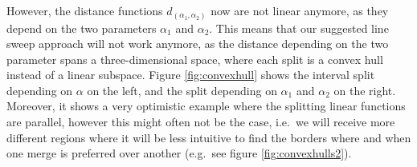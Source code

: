 However, the distance functions $d_{(\alpha_1, \alpha_2)}$ now are not linear anymore, as they depend on the two parameters $\alpha_1$ and $\alpha_2$. This means that our suggested line sweep approach will not work anymore, as the distance depending on the two parameter spans a three-dimensional space, where each split is a convex hull instead of a linear subspace. Figure \ref{fig:convexhull} shows the interval split depending on $\alpha$ on the left, and the split depending on $\alpha_1$ and $\alpha_2$ on the right. Moreover, it shows a very optimistic example where the splitting linear functions are parallel, however this might often not be the case, i.e.\ we will receive more different regions where it will be less intuitive to find the borders where and when one merge is preferred over another (e.g.\ see figure \ref{fig:convexhulls2}).

